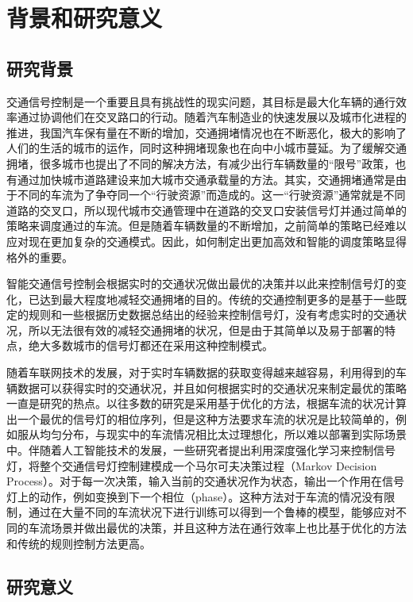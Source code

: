 
\chapter{背景和研究意义}
\section{研究背景}
交通信号控制是一个重要且具有挑战性的现实问题，其目标是最大化车辆的通行效率通过协调他们在交叉路口的行动。随着汽车制造业的快速发展以及城市化进程的推进，我国汽车保有量在不断的增加，交通拥堵情况也在不断恶化，极大的影响了人们的生活的城市的运作，同时这种拥堵现象也在向中小城市蔓延。为了缓解交通拥堵，很多城市也提出了不同的解决方法，有减少出行车辆数量的“限号”政策，也有通过加快城市道路建设来加大城市交通承载量的方法。其实，交通拥堵通常是由于不同的车流为了争夺同一个“行驶资源”而造成的。这一“行驶资源”通常就是不同道路的交叉口，所以现代城市交通管理中在道路的交叉口安装信号灯并通过简单的策略来调度通过的车流。但是随着车辆数量的不断增加，之前简单的策略已经难以应对现在更加复杂的交通模式。因此，如何制定出更加高效和智能的调度策略显得格外的重要。

智能交通信号控制会根据实时的交通状况做出最优的决策并以此来控制信号灯的变化，已达到最大程度地减轻交通拥堵的目的。传统的交通控制更多的是基于一些既定的规则和一些根据历史数据总结出的经验来控制信号灯，没有考虑实时的交通状况，所以无法很有效的减轻交通拥堵的状况，但是由于其简单以及易于部署的特点，绝大多数城市的信号灯都还在采用这种控制模式。

随着车联网技术的发展，对于实时车辆数据的获取变得越来越容易，利用得到的车辆数据可以获得实时的交通状况，并且如何根据实时的交通状况来制定最优的策略一直是研究的热点。以往多数的研究是采用基于优化的方法，根据车流的状况计算出一个最优的信号灯的相位序列，但是这种方法要求车流的状况是比较简单的，例如服从均匀分布，与现实中的车流情况相比太过理想化，所以难以部署到实际场景中。伴随着人工智能技术的发展，一些研究者提出利用深度强化学习来控制信号灯，将整个交通信号灯控制建模成一个马尔可夫决策过程（Markov Decision Process）。对于每一次决策，输入当前的交通状况作为状态，输出一个作用在信号灯上的动作，例如变换到下一个相位（phase）。这种方法对于车流的情况没有限制，通过在大量不同的车流状况下进行训练可以得到一个鲁棒的模型，能够应对不同的车流场景并做出最优的决策，并且这种方法在通行效率上也比基于优化的方法和传统的规则控制方法更高。

\section{研究意义}